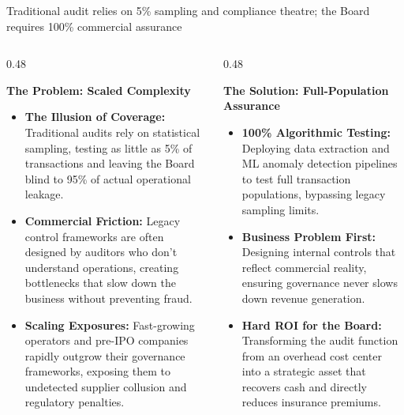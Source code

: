 \documentclass[aspectratio=169, 8pt]{beamer}
\begin{document}
\begin{frame}{Traditional audit relies on 5\% sampling and compliance theatre; the Board requires 100\% commercial assurance}
    \vspace{-0.2cm}
    \begin{columns}[T]
        \begin{column}{0.48\textwidth}
            \begin{tcolorbox}[colback=bcgLightGray, colframe=bcgLightGray, arc=0pt, left=3pt, top=2pt, bottom=2pt]
                \textbf{\normalsize \color{bcgDarkGray} The Problem: Scaled Complexity}
            \end{tcolorbox}
            \vspace{0.1cm}
            \begin{itemize}
                \setlength{\itemsep}{4pt}
                \item \textbf{The Illusion of Coverage:} Traditional audits rely on statistical sampling, testing as little as 5\% of transactions and leaving the Board blind to 95\% of actual operational leakage.
                \item \textbf{Commercial Friction:} Legacy control frameworks are often designed by auditors who don't understand operations, creating bottlenecks that slow down the business without preventing fraud.
                \item \textbf{Scaling Exposures:} Fast-growing operators and pre-IPO companies rapidly outgrow their governance frameworks, exposing them to undetected supplier collusion and regulatory penalties.
            \end{itemize}
        \end{column}
        
        \begin{column}{0.48\textwidth}
            \begin{tcolorbox}[colback=bcgGreen!15, colframe=bcgGreen!15, arc=0pt, left=3pt, top=2pt, bottom=2pt]
                \textbf{\normalsize \color{bcgGreen} The Solution: Full-Population Assurance}
            \end{tcolorbox}
            \vspace{0.1cm}
            \begin{itemize}
                \setlength{\itemsep}{4pt}
                \item \textbf{100\% Algorithmic Testing:} Deploying data extraction and ML anomaly detection pipelines to test full transaction populations, bypassing legacy sampling limits.
                \item \textbf{Business Problem First:} Designing internal controls that reflect commercial reality, ensuring governance never slows down revenue generation.
                \item \textbf{Hard ROI for the Board:} Transforming the audit function from an overhead cost center into a strategic asset that recovers cash and directly reduces insurance premiums.
            \end{itemize}
            

\end{column}
\end{columns}
\end{frame}
\end{document}
